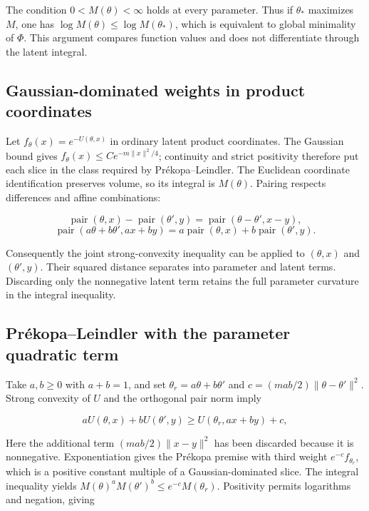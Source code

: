 \documentclass[11pt,a4paper]{article}
\begin{document}
The condition \(0<M(\theta)<\infty\) holds at every parameter. Thus if \(\theta_*\) maximizes \(M\), one has \(\log M(\theta)\le\log M(\theta_*)\), which is equivalent to global minimality of \(\Phi\). This argument compares function values and does not differentiate through the latent integral.



\subsection{\texorpdfstring{Gaussian-dominated weights in product coordinates}{Gaussian-dominated weights in product coordinates}}


Let \(f_\theta(x)=e^{-U(\theta,x)}\) in ordinary latent product coordinates. The Gaussian bound gives \(f_\theta(x)\le Ce^{-m\|x\|^2/4}\); continuity and strict positivity therefore put each slice in the class required by Prékopa–Leindler. The Euclidean coordinate identification preserves volume, so its integral is \(M(\theta)\). Pairing respects differences and affine combinations:

\[\operatorname{pair}(\theta,x)-\operatorname{pair}(\theta',y)=\operatorname{pair}(\theta-\theta',x-y),\]\[\operatorname{pair}(a\theta+b\theta',ax+by)=a\operatorname{pair}(\theta,x)+b\operatorname{pair}(\theta',y).\]

Consequently the joint strong-convexity inequality can be applied to \((\theta,x)\) and \((\theta',y)\). Their squared distance separates into parameter and latent terms. Discarding only the nonnegative latent term retains the full parameter curvature in the integral inequality.



\subsection{\texorpdfstring{Prékopa–Leindler with the parameter quadratic term}{Prékopa–Leindler with the parameter quadratic term}}


Take \(a,b\ge0\) with \(a+b=1\), and set \(\theta_r=a\theta+b\theta'\) and \(c=(mab/2)\|\theta-\theta'\|^2\). Strong convexity of \(U\) and the orthogonal pair norm imply

\[aU(\theta,x)+bU(\theta',y)\ge U(\theta_r,ax+by)+c,\]

Here the additional term \((mab/2)\|x-y\|^2\) has been discarded because it is nonnegative. Exponentiation gives the Prékopa premise with third weight \(e^{-c}f_{\theta_r}\), which is a positive constant multiple of a Gaussian-dominated slice. The integral inequality yields \(M(\theta)^aM(\theta')^b\le e^{-c}M(\theta_r)\). Positivity permits logarithms and negation, giving
\end{document}

